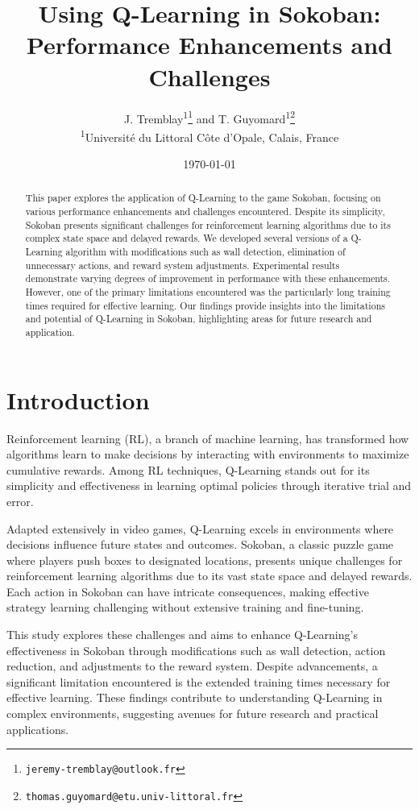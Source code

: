 \documentclass[10pt,twocolumn]{article}
\title{Using Q-Learning in Sokoban: Performance Enhancements and Challenges}
\author{
  J. Tremblay\textsuperscript{1}\thanks{\texttt{jeremy-tremblay@outlook.fr}}  
  \space and T. Guyomard\textsuperscript{1}\thanks{\texttt{thomas.guyomard@etu.univ-littoral.fr}} \\
  \textsuperscript{1}Université du Littoral Côte d'Opale, Calais, France
}
\date{\today}
\begin{document}
\maketitle

\begin{abstract}
    This paper explores the application of Q-Learning to the game Sokoban, focusing on various performance enhancements and challenges encountered. Despite its simplicity, Sokoban presents significant challenges for reinforcement learning algorithms due to its complex state space and delayed rewards. We developed several versions of a Q-Learning algorithm with modifications such as wall detection, elimination of unnecessary actions, and reward system adjustments. Experimental results demonstrate varying degrees of improvement in performance with these enhancements. However, one of the primary limitations encountered was the particularly long training times required for effective learning. Our findings provide insights into the limitations and potential of Q-Learning in Sokoban, highlighting areas for future research and application.
\end{abstract}

\section{Introduction}

Reinforcement learning (RL), a branch of machine learning, has transformed how algorithms learn to make decisions by interacting with environments to maximize cumulative rewards. Among RL techniques, Q-Learning stands out for its simplicity and effectiveness in learning optimal policies through iterative trial and error.

Adapted extensively in video games, Q-Learning excels in environments where decisions influence future states and outcomes. Sokoban, a classic puzzle game where players push boxes to designated locations, presents unique challenges for reinforcement learning algorithms due to its vast state space and delayed rewards. Each action in Sokoban can have intricate consequences, making effective strategy learning challenging without extensive training and fine-tuning.

This study explores these challenges and aims to enhance Q-Learning's effectiveness in Sokoban through modifications such as wall detection, action reduction, and adjustments to the reward system. Despite advancements, a significant limitation encountered is the extended training times necessary for effective learning. These findings contribute to understanding Q-Learning in complex environments, suggesting avenues for future research and practical applications.
\end{document}
